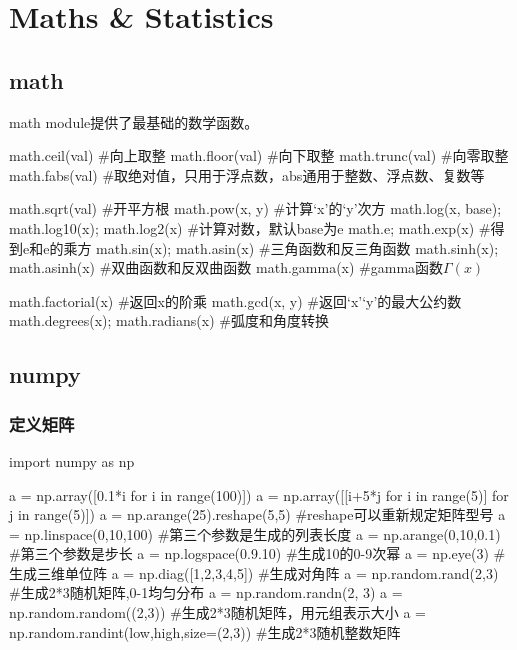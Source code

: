 \section{Maths \& Statistics}

  \subsection{math}
    math module提供了最基础的数学函数。
    \begin{codeblock}[language=python, caption={math module}]
      math.ceil(val) #向上取整
      math.floor(val) #向下取整
      math.trunc(val) #向零取整
      math.fabs(val) #取绝对值，只用于浮点数，abs通用于整数、浮点数、复数等

      math.sqrt(val) #开平方根
      math.pow(x, y) #计算`x'的`y'次方
      math.log(x, base); math.log10(x); math.log2(x) #计算对数，默认base为e
      math.e; math.exp(x) #得到e和e的乘方
      math.sin(x); math.asin(x) #三角函数和反三角函数
      math.sinh(x); math.asinh(x) #双曲函数和反双曲函数
      math.gamma(x) #gamma函数$\Gamma(x)$

      math.factorial(x) #返回x的阶乘
      math.gcd(x, y) #返回`x'`y'的最大公约数
      math.degrees(x); math.radians(x) #弧度和角度转换
    \end{codeblock}

  \subsection{numpy}
    \subsubsection{定义矩阵}
      \begin{codeblock}[language=python, caption={Define matrices using numpy}]
        import numpy as np

        a = np.array([0.1*i for i in range(100)])
        a = np.array([[i+5*j for i in range(5)] for j in range(5)])
        a = np.arange(25).reshape(5,5) #reshape可以重新规定矩阵型号
        a = np.linspace(0,10,100) #第三个参数是生成的列表长度
        a = np.arange(0,10,0.1) #第三个参数是步长
        a = np.logspace(0.9.10) #生成10的0-9次幂
        a = np.eye(3) #生成三维单位阵
        a = np.diag([1,2,3,4,5]) #生成对角阵
        a = np.random.rand(2,3) #生成2*3随机矩阵,0-1均匀分布
        a = np.random.randn(2, 3)
        a = np.random.random((2,3)) #生成2*3随机矩阵，用元组表示大小
        a = np.random.randint(low,high,size=(2,3)) #生成2*3随机整数矩阵
      \end{codeblock}

